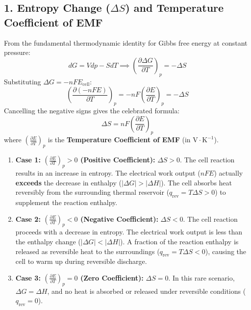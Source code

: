 \subsection{1. Entropy Change ($\Delta S$) and Temperature Coefficient of EMF}
From the fundamental thermodynamic identity for Gibbs free energy at constant pressure:
\begin{equation}
    dG = V dp - S dT \implies \left(\frac{\partial \Delta G}{\partial T}\right)_p = -\Delta S
\end{equation}
Substituting $\Delta G = -n F E_{\text{cell}}$:
\begin{equation}
    \left(\frac{\partial (-nFE)}{\partial T}\right)_p = -nF \left(\frac{\partial E}{\partial T}\right)_p = -\Delta S
\end{equation}
Cancelling the negative signs gives the celebrated formula:
\begin{equation}
    \boxed{\Delta S = n F \left(\frac{\partial E}{\partial T}\right)_p}
\end{equation}
where $\left(\frac{\partial E}{\partial T}\right)_p$ is the \textbf{Temperature Coefficient of EMF} (in $\text{V}\cdot\text{K}^{-1}$).

\begin{atkinsbox}
\begin{enumerate}[leftmargin=*]
    \item \textbf{Case 1: $\left(\frac{\partial E}{\partial T}\right)_p > 0$ (Positive Coefficient):}
    $\Delta S > 0$. The cell reaction results in an increase in entropy.
    The electrical work output ($nFE$) actually \textbf{exceeds} the decrease in enthalpy ($|\Delta G| > |\Delta H|$). The cell absorbs heat reversibly from the surrounding thermal reservoir ($q_{\text{rev}} = T\Delta S > 0$) to supplement the reaction enthalpy.
    \item \textbf{Case 2: $\left(\frac{\partial E}{\partial T}\right)_p < 0$ (Negative Coefficient):}
    $\Delta S < 0$. The cell reaction proceeds with a decrease in entropy.
    The electrical work output is less than the enthalpy change ($|\Delta G| < |\Delta H|$). A fraction of the reaction enthalpy is released as reversible heat to the surroundings ($q_{\text{rev}} = T\Delta S < 0$), causing the cell to warm up during reversible discharge.
    \item \textbf{Case 3: $\left(\frac{\partial E}{\partial T}\right)_p = 0$ (Zero Coefficient):}
    $\Delta S = 0$. In this rare scenario, $\Delta G = \Delta H$, and no heat is absorbed or released under reversible conditions ($q_{\text{rev}} = 0$).
\end{enumerate}
\end{atkinsbox}

